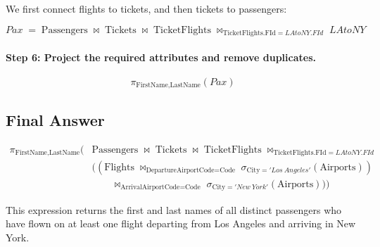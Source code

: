 \documentclass[11pt]{article}
\begin{document}
We first connect flights to tickets, and then tickets to passengers:

\[
Pax \;=\; \text{Passengers} \;\bowtie\; \text{Tickets} \;\bowtie\; \text{TicketFlights} \;\bowtie_{\text{TicketFlights.FId} = LAtoNY.FId}\; LAtoNY
\]

\paragraph{Step 6: Project the required attributes and remove duplicates.}

\[
\pi_{\text{FirstName}, \text{LastName}}(Pax)
\]

\subsection*{Final Answer}

\[
\boxed{
\begin{aligned}
\pi_{\text{FirstName}, \text{LastName}} \Big(
&\text{Passengers}
\;\bowtie\;
\text{Tickets}
\;\bowtie\;
\text{TicketFlights}
\;\bowtie_{\text{TicketFlights.FId} = LAtoNY.FId} \\
&\Big(
(\text{Flights}
\;\bowtie_{\text{DepartureAirportCode} = \text{Code}}\;
\sigma_{\text{City} = 'Los\ Angeles'}(\text{Airports})) \\
&\qquad\bowtie_{\text{ArrivalAirportCode} = \text{Code}}\;
\sigma_{\text{City} = 'New\ York'}(\text{Airports})
\Big)
\Big)
\end{aligned}
}
\]

This expression returns the first and last names of all distinct passengers who have flown on at least one flight departing from Los Angeles and arriving in New York.
\end{document}
